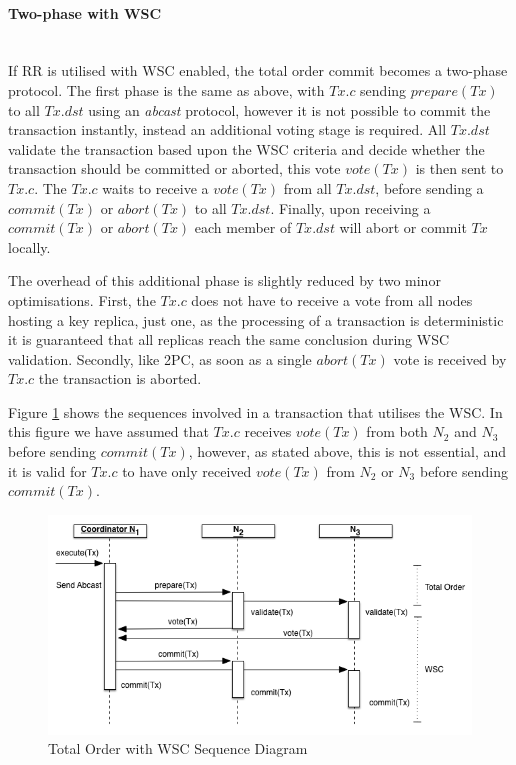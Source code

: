 		        
			\paragraph{Two-phase with WSC} \hspace{0pt} \\        
	        If RR is utilised with WSC enabled, the total order commit becomes a two-phase protocol.  The first phase is the same as above, with $Tx.c$ sending $prepare(Tx)$ to all $Tx.dst$ using an \emph{abcast} protocol, however it is not possible to commit the transaction instantly, instead an additional voting stage is required.  All $Tx.dst$ validate the transaction based upon the WSC criteria and decide whether the transaction should be committed or aborted, this vote $vote(Tx)$ is then sent to $Tx.c$.  The $Tx.c$ waits to receive a $vote(Tx)$ from all $Tx.dst$, before sending a $commit(Tx)$ or $abort(Tx)$ to all $Tx.dst$.  Finally, upon receiving a $commit(Tx)$ or $abort(Tx)$ each member of $Tx.dst$ will abort or commit $Tx$ locally.          
	        
			The overhead of this additional phase is slightly reduced by two minor optimisations.  First, the $Tx.c$ does not have to receive a vote from all nodes hosting a key replica, just one, as the processing of a transaction is deterministic it is guaranteed that all replicas reach the same conclusion during WSC validation.  Secondly, like 2PC, as soon as a single $abort(Tx)$ vote is received by $Tx.c$ the transaction is aborted.  
			
			Figure \ref{fig:total_order_wsc} shows the sequences involved in a transaction that utilises the WSC.  In this figure we have assumed that $Tx.c$ receives $vote(Tx)$ from both $N_2$ and $N_3$ before sending $commit(Tx)$, however, as stated above, this is not essential, and it is valid for $Tx.c$ to have only received $vote(Tx)$ from $N_2$ or $N_3$ before sending $commit(Tx)$.  
	        
	        \begin{figure}[htbp!] 
                \centering    
                \includegraphics[width=1.0\textwidth]{WSC-Abcast}
                \caption[Total Order Commit with Write Skew Check]{Total Order with WSC Sequence Diagram}
                \label{fig:total_order_wsc}
            \end{figure}	      	
                        
